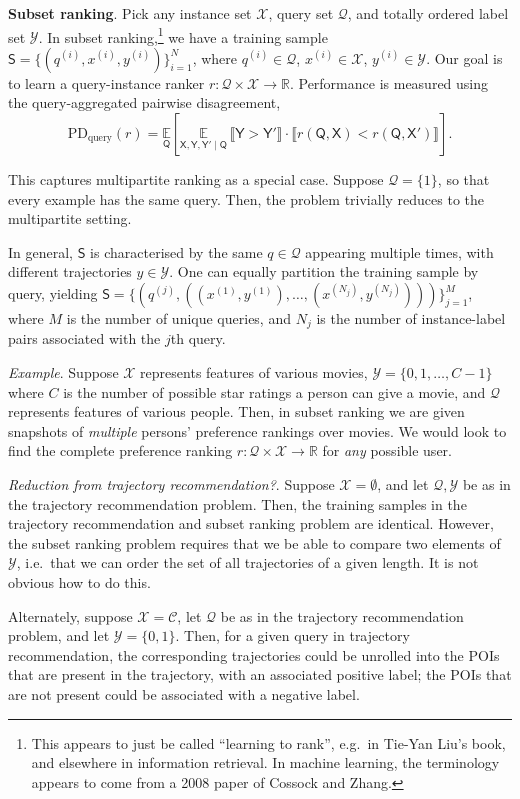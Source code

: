 \documentclass{article}
\newcommand{\eg}{e.g.\ }
\newcommand{\ie}{i.e.\ }
\newcommand{\indicator}[1]{\llbracket #1 \rrbracket}
\newcommand{\E}[2]{\underset{#1}{\mathbb{E}}\left[ #2 \right]}
\newcommand{\ES}[2]{\underset{#1}{\mathbb{E}}\, #2}
\newcommand{\X}{\mathsf{X}}
\newcommand{\Y}{\mathsf{Y}}
\newcommand{\Q}{\mathsf{Q}}
\newcommand{\SSf}{\mathsf{S}}
\newcommand{\CCal}{\mathscr{C}}
\newcommand{\QCal}{\mathscr{Q}}
\newcommand{\XCal}{\mathscr{X}}
\newcommand{\YCal}{\mathscr{Y}}
\newcommand{\Real}{\mathbb{R}}
\begin{document}
%
\textbf{Subset ranking}.
Pick any instance set $\XCal$,
query set $\QCal$,
and totally ordered label set $\YCal$.
In subset ranking,\footnote{This appears to just be called ``learning to rank'', \eg in Tie-Yan Liu's book, and elsewhere in information retrieval. In machine learning, the terminology appears to come from a 2008 paper of Cossock and Zhang.}
we have a training sample $\SSf = \{ ( q^{(i)}, x^{(i)}, y^{(i)} ) \}_{i = 1}^N$,
where
$q^{(i)} \in \QCal$,
$x^{(i)} \in \XCal$,
$y^{(i)} \in \YCal$.
Our goal is to learn a query-instance ranker $r \colon \QCal \times \XCal \to \Real$.
Performance is measured using the
query-aggregated
pairwise disagreement,
$$ \mathrm{PD}_{\mathrm{query}}( r ) = \E{\Q}{ \ES{\X, \Y, \Y' \mid \Q}{ \indicator{ \Y > \Y' } \cdot \indicator{ r( \Q, \X ) < r( \Q, \X' ) } } }. $$

This captures multipartite ranking as a special case.
Suppose $\QCal = \{ 1 \}$, so that every example has the same query.
Then, the problem trivially reduces to the multipartite setting.

In general, $\SSf$ is characterised by the same $q \in \QCal$ appearing multiple times, with different trajectories $y \in \YCal$.
One can equally partition the training sample by query, yielding
$ \SSf = \{ ( q^{(j)}, ( ( x^{(1)}, y^{(1)} ), \ldots, ( x^{(N_j)}, y^{(N_j)} ) ) ) \}_{j = 1}^{M} $,
where $M$ is the number of unique queries,
and $N_j$ is the number of instance-label pairs associated with the $j$th query.

\emph{Example}.
Suppose $\XCal$ represents features of various movies, $\YCal = \{ 0, 1, \ldots, C - 1 \}$ where $C$ is the number of possible star ratings a person can give a movie,
and $\QCal$ represents features of various people.
Then, in subset ranking we are given snapshots of \emph{multiple} persons' preference rankings over movies.
We would look to find the complete preference ranking $r \colon \QCal \times \XCal \to \Real$ for \emph{any} possible user.

\emph{Reduction from trajectory recommendation?}.
Suppose $\XCal = \emptyset$,
and let $\QCal, \YCal$ be as in the trajectory recommendation problem.
Then, the training samples in the trajectory recommendation and subset ranking problem are identical.
However, the subset ranking problem requires that we be able to compare two elements of $\YCal$, \ie that we can order the set of all trajectories of a given length.
It is not obvious how to do this.

Alternately, suppose $\XCal = \CCal$,
let $\QCal$ be as in the trajectory recommendation problem,
and let $\YCal = \{ 0, 1 \}$.
Then, for a given query in trajectory recommendation,
the corresponding trajectories could be unrolled into the POIs that are present in the trajectory, with an associated positive label;
the POIs that are not present could be associated with a negative label.
\end{document}
